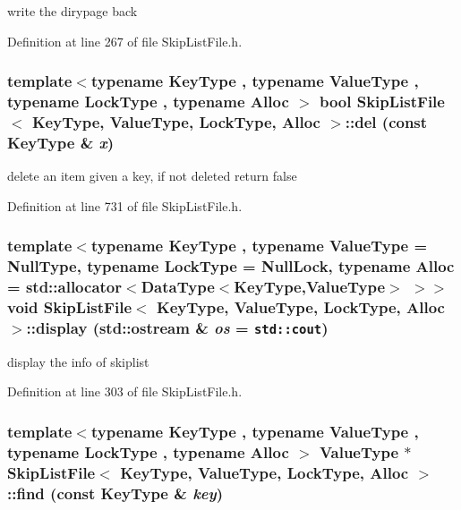 write the dirypage back 

Definition at line 267 of file SkipListFile.h.\hypertarget{classSkipListFile_67061b1d6b1bda62005b93ca30686076}{
\subsubsection[{del}]{\setlength{\rightskip}{0pt plus 5cm}template$<$typename KeyType , typename ValueType , typename LockType , typename Alloc $>$ bool {\bf SkipListFile}$<$ KeyType, ValueType, LockType, Alloc $>$::del (const KeyType \& {\em x})}}
\label{classSkipListFile_67061b1d6b1bda62005b93ca30686076}


delete an item given a key, if not deleted return false 

Definition at line 731 of file SkipListFile.h.\hypertarget{classSkipListFile_e794422745a92d67462d68c1b138bcc4}{
\subsubsection[{display}]{\setlength{\rightskip}{0pt plus 5cm}template$<$typename KeyType , typename ValueType  = NullType, typename LockType  = NullLock, typename Alloc  = std::allocator$<$DataType$<$KeyType,ValueType$>$ $>$$>$ void {\bf SkipListFile}$<$ KeyType, ValueType, LockType, Alloc $>$::display (std::ostream \& {\em os} = {\tt std::cout})}}
\label{classSkipListFile_e794422745a92d67462d68c1b138bcc4}


display the info of skiplist 

Definition at line 303 of file SkipListFile.h.\hypertarget{classSkipListFile_d5991f6c784169c5cf582d9700eb7d78}{
\subsubsection[{find}]{\setlength{\rightskip}{0pt plus 5cm}template$<$typename KeyType , typename ValueType , typename LockType , typename Alloc $>$ ValueType $\ast$ {\bf SkipListFile}$<$ KeyType, ValueType, LockType, Alloc $>$::find (const KeyType \& {\em key})}}
\label{classSkipListFile_d5991f6c784169c5cf582d9700eb7d78}



